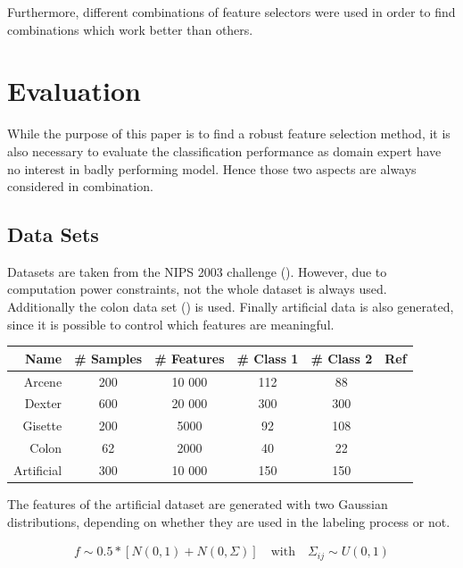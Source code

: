 \documentclass[twoside,11pt]{article}
\begin{document}
Furthermore, different combinations of feature selectors were used in order to find combinations which work better than others.

\section{Evaluation}

While the purpose of this paper is to find a robust feature selection method, it is also necessary to evaluate the classification performance as domain expert have no interest in badly performing model. Hence those two aspects are always considered in combination.

\subsection{Data Sets}
Datasets are taken from the NIPS 2003 challenge (\cite{NIPS}). However, due to computation power constraints, not the whole dataset is always used. Additionally the colon data set (\cite{alon1999broad}) is used. Finally artificial data is also generated, since it is possible to control which features are meaningful. 

\begin{center}
    \begin{tabular}{| r | c | c | c | c | c |}
    \hline
    Name & \# Samples & \# Features & \# Class 1 & \# Class 2 & Ref\\ \hline
    Arcene & 200 & 10 000 & 112 & 88 & \cite{NIPS} \\
    Dexter & 600 & 20 000 & 300 & 300 & \cite{NIPS} \\
    Gisette & 200 & 5000 & 92 & 108 & \cite{NIPS} \\
    Colon & 62 & 2000 & 40 & 22 &  \cite{alon1999broad} \\
    Artificial & 300 & 10 000 & 150 & 150 & \\
    \hline
    \end{tabular}
\end{center}

The features of the artificial dataset are generated with two Gaussian distributions, depending on whether they are used in the labeling process or not.

\begin{align}
f \sim0.5 * \left[ N(0, 1) + N(0, \Sigma) \right]  \quad \text{with} \quad \Sigma_{ij} \sim U(0,1)
\end{align}
\end{document}
